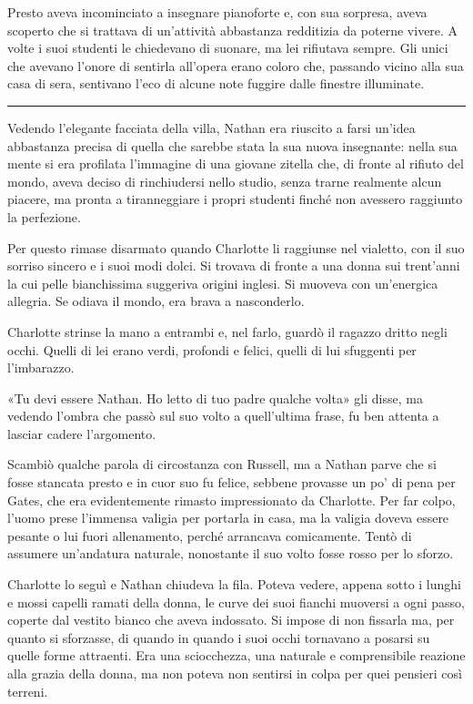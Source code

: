 \documentclass[a4paper,oneside,11pt]{memoir}
\begin{document}
Presto aveva incominciato a insegnare pianoforte e, con sua sorpresa, aveva
scoperto che si trattava di un'attività abbastanza redditizia da poterne vivere.
A volte i suoi studenti le chiedevano di suonare, ma lei rifiutava sempre. Gli
unici che avevano l'onore di sentirla all'opera erano coloro che, passando
vicino alla sua casa di sera, sentivano l'eco di alcune note fuggire dalle
finestre illuminate.

\plainbreak{1}

Vedendo l'elegante facciata della villa, Nathan era riuscito a farsi un'idea
abbastanza precisa di quella che sarebbe stata la sua nuova insegnante: nella
sua mente si era profilata l'immagine di una giovane zitella che, di fronte al
rifiuto del mondo, aveva deciso di rinchiudersi nello studio, senza trarne
realmente alcun piacere, ma pronta a tiranneggiare i propri studenti finché non
avessero raggiunto la perfezione.

Per questo rimase disarmato quando Charlotte li raggiunse nel vialetto, con il
suo sorriso sincero e i suoi modi dolci. Si trovava di fronte a una donna sui
trent'anni la cui pelle bianchissima suggeriva origini inglesi. Si muoveva con
un'energica allegria. Se odiava il mondo, era brava a nasconderlo.

Charlotte strinse la mano a entrambi e, nel farlo, guardò il ragazzo dritto
negli occhi. Quelli di lei erano verdi, profondi e felici, quelli di lui
sfuggenti per l'imbarazzo.

«Tu devi essere Nathan. Ho letto di tuo padre qualche volta» gli disse, ma
vedendo l'ombra che passò sul suo volto a quell'ultima frase, fu ben attenta a
lasciar cadere l'argomento.

Scambiò qualche parola di circostanza con Russell, ma a Nathan parve che si
fosse stancata presto e in cuor suo fu felice, sebbene provasse un po' di pena
per Gates, che era evidentemente rimasto impressionato da Charlotte. Per far
colpo, l'uomo prese l'immensa valigia per portarla in casa, ma la valigia doveva
essere pesante o lui fuori allenamento, perché arrancava comicamente. Tentò di
assumere un'andatura naturale, nonostante il suo volto fosse rosso per lo
sforzo.

Charlotte lo seguì e Nathan chiudeva la fila. Poteva vedere, appena sotto i
lunghi e mossi capelli ramati della donna, le curve dei suoi fianchi muoversi a
ogni passo, coperte dal vestito bianco che aveva indossato. Si impose di non
fissarla ma, per quanto si sforzasse, di quando in quando i suoi occhi tornavano
a posarsi su quelle forme attraenti. Era una sciocchezza, una naturale e
comprensibile reazione alla grazia della donna, ma non poteva non sentirsi in
colpa per quei pensieri così terreni.
\end{document}
